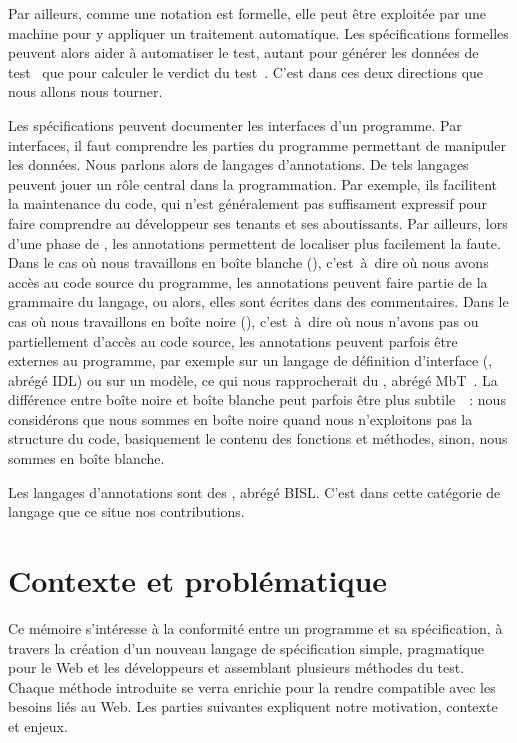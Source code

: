 Par ailleurs, comme une notation est formelle, elle peut être exploitée par une
machine pour y appliquer un traitement automatique. Les spécifications
formelles peuvent alors aider à {\strong automatiser le test}, autant pour
générer les données de test~
que pour calculer le verdict du test~. C'est dans ces deux
directions que nous allons nous tourner.

Les spécifications peuvent documenter les {\strong interfaces} d'un programme.
Par interfaces, il faut comprendre les parties du programme permettant de
manipuler les données. Nous parlons alors de {\strong langages d'annotations}.
De tels langages peuvent jouer un rôle central dans la programmation. Par
exemple, ils facilitent la maintenance du code, qui n'est généralement pas
suffisament expressif pour faire comprendre au développeur ses tenants et ses
aboutissants. Par ailleurs, lors d'une phase de , les
annotations permettent de localiser plus facilement la faute. Dans le cas où
nous travaillons en boîte blanche (), c'est~à~dire où nous
avons accès au code source du programme, les annotations peuvent faire partie de
la grammaire du langage, ou alors, elles sont écrites dans des {\strong
commentaires}. Dans le cas où nous travaillons en boîte noire
(), c'est~à~dire où nous n'avons pas ou partiellement
d'accès au code source, les annotations peuvent parfois être externes au
programme, par exemple sur un langage de définition d'interface
(, abrégé IDL) ou sur un modèle, ce qui
nous rapprocherait du , abrégé
MbT~. La différence entre boîte noire et boîte blanche peut
parfois être plus subtile~~: nous considérons que nous sommes en
boîte noire quand nous n'exploitons pas la structure du code, basiquement le
contenu des fonctions et méthodes, sinon, nous sommes en boîte blanche.

Les langages d'annotations sont des , abrégé BISL. C'est dans cette catégorie de langage que
ce situe nos contributions.

\section{Contexte et problématique}

Ce mémoire s'intéresse à la conformité entre un programme et sa spécification, à
travers la création d'un nouveau langage de spécification simple, pragmatique
pour le Web et les développeurs et assemblant plusieurs méthodes du test. Chaque
méthode introduite se verra enrichie pour la rendre compatible avec les besoins
liés au Web. Les parties suivantes expliquent notre motivation, contexte et
enjeux.

